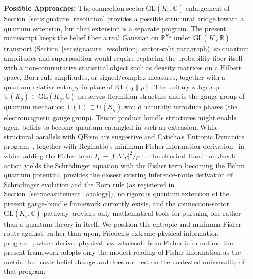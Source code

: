 \documentclass[11pt]{article}
\begin{document}
\textbf{Possible Approaches:} The connection-sector $\mathrm{GL}(K_q, \mathbb{C})$ enlargement of Section~\ref{sec:signature_resolution} provides a possible structural bridge toward a quantum extension, but that extension is a separate program. The present manuscript keeps the belief fiber a real Gaussian on $\mathbb{R}^{K_q}$ under $\mathrm{GL}(K_q, \mathbb{R})$ transport (Section~\ref{sec:signature_resolution}, sector-split paragraph), so quantum amplitudes and superposition would require replacing the probability fiber itself with a non-commutative statistical object such as density matrices on a Hilbert space, Born-rule amplitudes, or signed/complex measures, together with a quantum relative entropy in place of $\mathrm{KL}(q \| p)$. The unitary subgroup $\mathrm{U}(K_q) \subset \mathrm{GL}(K_q, \mathbb{C})$ preserves Hermitian structure and is the gauge group of quantum mechanics; $\mathrm{U}(1) \subset \mathrm{U}(K_q)$ would naturally introduce phases (the electromagnetic gauge group). Tensor product bundle structures might enable agent beliefs to become quantum-entangled in such an extension. While structural parallels with QBism are suggestive and Caticha's Entropic Dynamics program~\cite{Caticha2015, Caticha2019, JohnsonCaticha2011}, together with Reginatto's minimum-Fisher-information derivation~\cite{reginatto1998derivation} in which adding the Fisher term $I_F = \int |\nabla\rho|^2/\rho$ to the classical Hamilton-Jacobi action yields the Schr\"odinger equation with the Fisher term becoming the Bohm quantum potential, provides the closest existing inference-route derivation of Schr\"odinger evolution and the Born rule (as registered in Section~\ref{sec:measurement_analogy}), no rigorous quantum extension of the present gauge-bundle framework currently exists, and the connection-sector $\mathrm{GL}(K_q, \mathbb{C})$ pathway provides only mathematical tools for pursuing one rather than a quantum theory in itself. We position this entropic and minimum-Fisher route against, rather than upon, Frieden's extreme-physical-information program~\cite{frieden1998physics}, which derives physical law wholesale from Fisher information: the present framework adopts only the modest reading of Fisher information as the metric that costs belief change and does not rest on the contested universality of that program.
\end{document}
